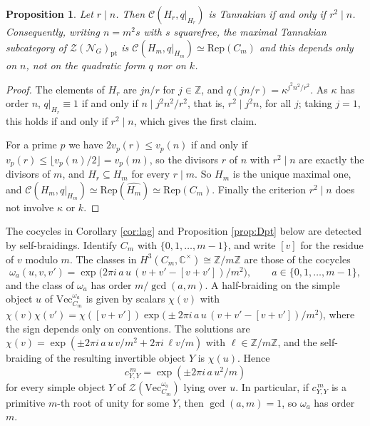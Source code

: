 \documentclass[10pt]{article}
\theoremstyle{plain}
\newtheorem{proposition}[theorem]{Proposition}
\theoremstyle{definition}
\theoremstyle{plain}
\begin{document}
\begin{proposition}\label{prop:maxtann}
Let $r\mid n$.  Then $\mathcal{C}(H_r,q|_{H_r})$ is Tannakian if and only if
$r^{2}\mid n$.  Consequently, writing $n=m^{2}s$ with $s$ squarefree, the maximal
Tannakian subcategory of $\mathcal{Z}(\mathcal{N}_G)_{\mathrm{pt}}$ is $\mathcal{C}(H_m,q|_{H_m})\simeq\mathrm{Rep}(C_m)$ and this depends only on $n$, not on the quadratic form $q$ nor on $k$.
\end{proposition}
 
\begin{proof}
The elements of $H_r$ are $jn/r$ for $j\in\mathbb{Z}$, and $q(jn/r)=\kappa^{j^2n^2/r^2}$. As $\kappa$ has order $n$, $q|_{H_r}\equiv1$ if and only if $n\mid j^{2}n^{2}/r^{2}$, that is, $r^{2}\mid j^{2}n$, for all $j$; taking $j=1$, this holds if and only if $r^{2}\mid n$, which gives the first claim.
 
For a prime $p$ we have $2v_p(r)\le v_p(n)$ if and only if
$v_p(r)\le\lfloor v_p(n)/2\rfloor=v_p(m)$, so the divisors $r$ of $n$ with
$r^{2}\mid n$ are exactly the divisors of $m$, and $H_r\subseteq H_m$ for every $r\mid m$. So $H_m$ is the unique maximal one, and $\mathcal{C}(H_m,q|_{H_m})\simeq\mathrm{Rep}(\widehat{H_m})\simeq\mathrm{Rep}(C_m)$.  Finally the criterion $r^{2}\mid n$ does
not involve $\kappa$ or $k$.
\end{proof}
 
 
\par The cocycles in Corollary \ref{cor:lag} and Proposition \ref{prop:Dpt} below are detected by self-braidings. Identify $C_m$ with $\{0,1,\dots,m-1\}$, and write $[v]$ for the residue of $v$ modulo $m$. The classes in $H^{3}(C_m,\mathbb{C}^{\times})\cong\mathbb{Z}/m\mathbb{Z}$ are those of the cocycles
\[
\omega_a(u,v,v')=\exp\bigl(2\pi i\,a\,u\,(v+v'-[v+v'])/m^2\bigr),\qquad a\in\{0,1,\dots,m-1\},
\]
and the class of $\omega_a$ has order $m/\gcd(a,m)$. A half-braiding on the simple object $u$ of $\mathrm{Vec}^{\omega_a}_{C_m}$ is given by scalars $\chi(v)$ with $\chi(v)\chi(v')=\chi([v+v'])\exp\bigl(\pm2\pi i\,a\,u\,(v+v'-[v+v'])/m^2\bigr)$, where the sign depends only on conventions. The solutions are $\chi(v)=\exp(\pm2\pi i\,a\,u\,v/m^2+2\pi i\,\ell v/m)$ with $\ell\in\mathbb{Z}/m\mathbb{Z}$, and the self-braiding of the resulting invertible object $Y$ is $\chi(u)$. Hence
\begin{equation}\label{eq:twistm}
c_{Y,Y}^{\,m}=\exp(\pm2\pi i\,a\,u^2/m)
\end{equation}
for every simple object $Y$ of $\mathcal{Z}(\mathrm{Vec}^{\omega_a}_{C_m})$ lying over $u$. In particular, if $c_{Y,Y}^{\,m}$ is a primitive $m$-th root of unity for some $Y$, then $\gcd(a,m)=1$, so $\omega_a$ has order $m$.
\end{document}
